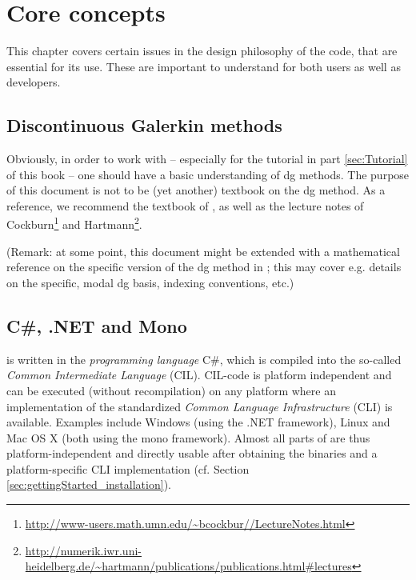 \documentclass[a4paper,10pt]{report} %
\begin{document}
\chapter{Core concepts}
\label{sec:coreConcepts}

This chapter covers certain issues in the design philosophy of the code, that are essential for its use. 
These are important to understand for both users as well as developers.

\section{Discontinuous Galerkin methods}
\label{sec:coreConcepts_dgMethods}
Obviously, in order to work with \BoSSS{} -- especially for the tutorial in part \ref{sec:Tutorial}
of this book -- one should have a basic understanding of \ac{dg} methods.
The purpose of this document is not to be (yet another) textbook on the \ac{dg} method.
As a reference, we recommend the textbook of \textcite{DiPietroErn2011},
as well as the lecture notes of Cockburn\footnote{
\url{http://www-users.math.umn.edu/~bcockbur//LectureNotes.html}}
and Hartmann\footnote{
\url{http://numerik.iwr.uni-heidelberg.de/~hartmann/publications/publications.html\#lectures}}.

(Remark: at some point, this document might be extended with a mathematical
reference on the specific version of the \ac{dg} method in \BoSSS; this may cover e.g.
details on the specific, modal \ac{dg} basis, indexing conventions, etc.)


\section{C\#, .NET and Mono}
\label{sec:coreConcepts_CsharpAndDotnet}
\BoSSS{} is written in the \emph{programming language} C\#, which is compiled into the so-called 
\emph{Common Intermediate Language} (CIL). CIL-code is platform independent and can be executed (without recompilation) 
on any platform where an implementation of the standardized \emph{Common Language Infrastructure} (CLI) is available. 
Examples include Windows (using the .NET framework), Linux and Mac OS X (both using the mono framework). 
Almost all parts of \BoSSS{} are thus platform-independent and directly usable after obtaining the \BoSSS{} binaries 
and a platform-specific CLI implementation (cf. Section \ref{sec:gettingStarted_installation}).
\end{document}
